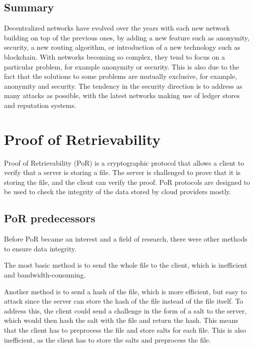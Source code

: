 \subsection{Summary}

Decentralized networks have evolved over the years with each new network building on top of the previous ones,
by adding a new feature such as anonymity, security, a new routing algorithm, or introduction of a new technology
such as blockchain.
With networks becoming so complex, they tend to focus on a particular problem,
for example anonymity or security.
This is also due to the fact that the solutions to some problems are mutually exclusive,
for example, anonymity and security.
The tendency in the security direction is to address as many attacks as possible,
with the latest networks making use of ledger stores and reputation systems.

\section{Proof of Retrievability}
\label{section:por}

Proof of Retrievability (PoR) \cite{porfirst} is a cryptographic protocol that
allows a client to verify that a server is storing a file.
The server is challenged to prove that it is storing the file, and the client
can verify the proof.
PoR protocols are designed to be used to check the integrity of the data stored by cloud providers mostly.

\subsection{PoR predecessors}

Before PoR became an interest and a field of research, there were other methods to ensure data integrity.

The most basic method is to send the whole file to the client, which is inefficient and bandwidth-consuming.

Another method is to send a hash of the file, which is more efficient, but easy to attack since
the server can store the hash of the file instead of the file itself.
To address this, the client could send a challenge in the form of a salt to the server,
which would then hash the salt with the file and return the hash.
This means that the client has to preprocess the file and store salts for each file.
This is also inefficient, as the client has to store the salts and preprocess the file.

